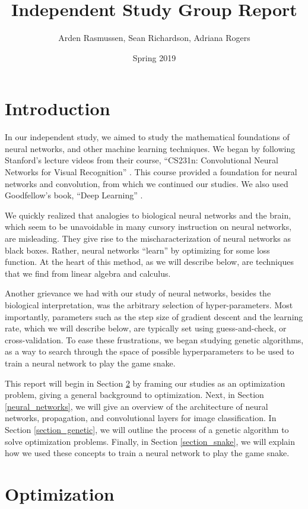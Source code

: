 \documentclass{amsart}
\title{Independent Study Group Report}
\author{Arden Rasmussen, Sean Richardson, Adriana Rogers }
\date{Spring 2019}
\begin{document}
\maketitle

\section{Introduction}
In our independent study, we aimed to study the mathematical foundations of
neural networks, and other machine learning techniques. We began by following
Stanford's lecture videos from their course, ``CS231n: Convolutional Neural
Networks for Visual Recognition'' \cite{stanford}. This course provided a
foundation for neural networks and convolution, from which we continued our
studies. We also used Goodfellow's book, ``Deep Learning''
\cite{Goodfellow-et-al-2016}.

We quickly realized that analogies to biological neural networks and the brain,
which seem to be unavoidable in many cursory instruction on neural networks,
are misleading. They give rise to the mischaracterization of neural networks as
black boxes. Rather, neural networks ``learn'' by optimizing for some loss
function. At the heart of this method, as we will describe below, are
techniques that we find from linear algebra and  calculus.

Another grievance we had with our study of neural networks, besides the
biological interpretation, was the arbitrary selection of hyper-parameters.
Most importantly, parameters such as the step size of gradient descent and the
learning rate, which we will describe below, are typically set using
guess-and-check, or cross-validation. To ease these frustrations, we began
studying genetic algorithms, as a way to search through the space of possible
hyperparameters to be used to train a neural network to play the game snake.

This report will begin in Section \ref{optimization} by framing our studies as
an optimization problem, giving a general background to optimization. Next, in
Section \ref{neural_networks}, we will give an overview of the architecture of
neural networks, propagation, and convolutional layers for image
classification. In Section \ref{section_genetic}, we will outline the process
of a genetic algorithm to solve optimization problems. Finally, in Section
\ref{section_snake}, we will explain how we used these concepts to train a
neural network to play the game snake.

\section{Optimization} \label{optimization}
\end{document}
